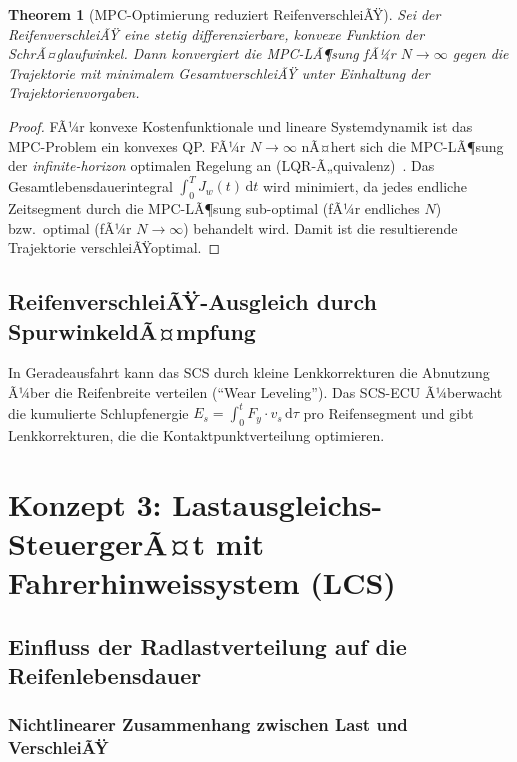 ﻿\documentclass[12pt,a4paper]{article}
\newtheorem{theorem}{Theorem}[section]
\theoremstyle{definition}
\theoremstyle{remark}
\begin{document}
\begin{theorem}[MPC-Optimierung reduziert ReifenverschleiÃŸ]
\label{thm:mpc_wear}
Sei der ReifenverschleiÃŸ eine stetig differenzierbare, konvexe Funktion der
SchrÃ¤glaufwinkel. Dann konvergiert die MPC-LÃ¶sung fÃ¼r $N \to \infty$ gegen
die Trajektorie mit minimalem GesamtverschleiÃŸ unter Einhaltung der
Trajektorienvorgaben.
\end{theorem}

\begin{proof}
FÃ¼r konvexe Kostenfunktionale und lineare Systemdynamik ist das MPC-Problem
ein konvexes QP. FÃ¼r $N \to \infty$ nÃ¤hert sich die MPC-LÃ¶sung der
\emph{infinite-horizon} optimalen Regelung an (LQR-Ã„quivalenz)~\cite{Mayne2000}.
Das Gesamtlebensdauerintegral $\int_0^T J_w(t)\,\mathrm{d}t$ wird minimiert,
da jedes endliche Zeitsegment durch die MPC-LÃ¶sung sub-optimal (fÃ¼r endliches $N$)
bzw.\ optimal (fÃ¼r $N \to \infty$) behandelt wird. Damit ist die resultierende
Trajektorie verschleiÃŸoptimal.
\end{proof}

\subsection{ReifenverschleiÃŸ-Ausgleich durch SpurwinkeldÃ¤mpfung}

In Geradeausfahrt kann das SCS durch kleine Lenkkorrekturen die Abnutzung
Ã¼ber die Reifenbreite verteilen (``Wear Leveling''). Das SCS-ECU Ã¼berwacht
die kumulierte Schlupfenergie $E_s = \int_0^t F_y \cdot v_s \,\mathrm{d}\tau$
pro Reifensegment und gibt Lenkkorrekturen, die die Kontaktpunktverteilung
optimieren.

\section{Konzept 3: Lastausgleichs-SteuergerÃ¤t mit Fahrerhinweissystem (LCS)}
\label{sec:lcs}

\subsection{Einfluss der Radlastverteilung auf die Reifenlebensdauer}

\subsubsection{Nichtlinearer Zusammenhang zwischen Last und VerschleiÃŸ}
\end{document}
